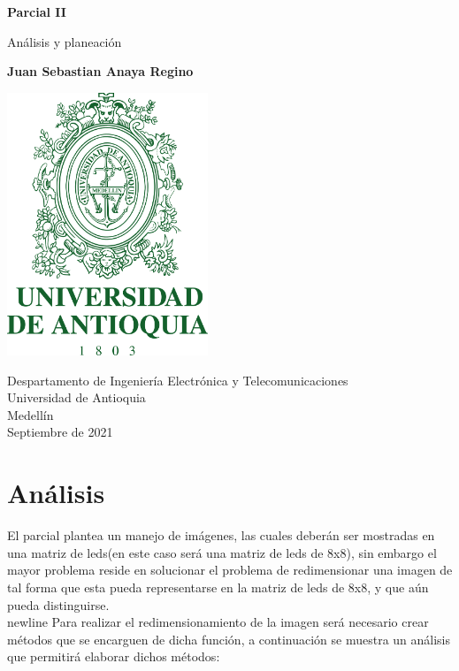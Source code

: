 \documentclass{article}
\begin{document}
\begin{titlepage}
    \begin{center}
        \vspace*{1cm}
            
        \Huge
        \textbf{Parcial II}
            
        \vspace{0.5cm}
        \LARGE
        Análisis y planeación
            
        \vspace{1.5cm}
            
        \textbf{Juan Sebastian Anaya Regino}
            
        \vspace{0.9cm}
        \centering
        \includegraphics[width=6cm]{images/logo.png}
            
        \vfill
            
        \vspace{0.8cm}
            
        \Large
        Despartamento de Ingeniería Electrónica y Telecomunicaciones\\
        Universidad de Antioquia\\
        Medellín\\
        Septiembre de 2021
            
    \end{center}
\end{titlepage}

\section{Análisis}
El parcial plantea un manejo de imágenes, las cuales deberán ser mostradas en una matriz de leds(en este caso será una matriz de leds de 8x8), sin embargo el mayor problema reside en solucionar el problema de redimensionar una imagen de tal forma que esta pueda representarse en la matriz de leds de 8x8, y que aún pueda distinguirse. \\newline
Para realizar el redimensionamiento de la imagen será necesario crear métodos que se encarguen de dicha función, a continuación se muestra un análisis que permitirá elaborar dichos métodos:
\end{document}
